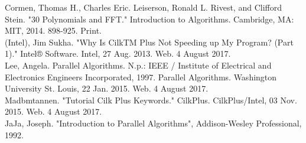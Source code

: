 \noindent[1] Cormen, Thomas H., Charles Eric. Leiserson, Ronald L. Rivest, and Clifford Stein. "30 Polynomials and FFT." Introduction to Algorithms. Cambridge, MA: MIT, 2014. 898-925. Print.\\

\noindent[2] (Intel), Jim Sukha. "Why Is CilkTM Plus Not Speeding up My Program? (Part 1)." Intel® Software. Intel, 27 Aug. 2013. Web. 4 August 2017.\\

\noindent[3] Lee, Angela. Parallel Algorithms. N.p.: IEEE / Institute of Electrical and Electronics Engineers Incorporated, 1997. Parallel Algorithms. Washington University St. Louis, 22 Jan. 2015. Web. 4 August 2017.\\

\noindent[4] Madbmtannen. "Tutorial Cilk Plus Keywords." CilkPlus. CilkPlus/Intel, 03 Nov. 2015. Web. 4 August 2017.\\

\noindent[5] JaJa, Joseph. "Introduction to Parallel Algorithms", Addison-Wesley Professional, 1992.